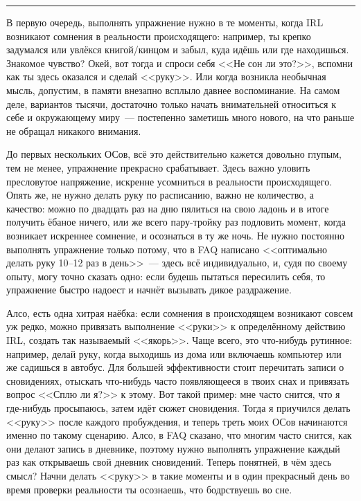 \documentclass[a4paper,14pt,oneside]{memoir}
\begin{document}
\smallskip

\fancybreak{* * *}

В первую очередь, выполнять упражнение нужно в те моменты, когда IRL возникают сомнения в реальности происходящего: например, ты крепко задумался или увлёкся книгой/кинцом и забыл, куда идёшь или где находишься. Знакомое чувство? Окей, вот тогда и спроси себя <<Не сон ли это?>>, вспомни как ты здесь оказался и сделай <<руку>>. Или когда возникла необычная мысль, допустим, в памяти внезапно всплыло давнее воспоминание. На самом деле, вариантов тысячи, достаточно только начать внимательней относиться к себе и окружающему миру~--- постепенно заметишь много нового, на что раньше не обращал никакого внимания. 

До  первых нескольких ОСов, всё это действительно кажется довольно глупым, тем не менее, упражнение прекрасно срабатывает. Здесь важно уловить пресловутое напряжение, искренне усомниться в реальности происходящего. Опять же, не нужно делать руку по расписанию, важно не количество, а качество: можно по двадцать раз на дню пялиться на свою ладонь и в итоге получить ёбаное ничего,  или же всего пару-тройку раз подловить момент, когда возникает искреннее сомнение, и осознаться в ту же ночь. Не нужно постоянно выполнять упражнение только потому, что в FAQ написано <<оптимально делать руку 10--12 раз в день>>~--- здесь всё индивидуально, и, судя по своему опыту, могу точно сказать одно: если будешь пытаться пересилить себя, то упражнение быстро надоест и начнёт вызывать дикое раздражение.

Алсо, есть одна хитрая наёбка: если сомнения в происходящем возникают совсем уж редко, можно привязать выполнение <<руки>> к определённому действию IRL, создать так называемый <<якорь>>. Чаще всего, это что-нибудь рутинное: например, делай руку, когда выходишь из дома или включаешь компьютер или же садишься в автобус. Для большей эффективности стоит перечитать записи о сновидениях, отыскать что-нибудь часто появляющееся в твоих снах и привязать вопрос <<Сплю ли я?>> к этому. Вот такой пример: мне часто снится, что я где-нибудь просыпаюсь, затем идёт сюжет сновидения. Тогда я приучился делать <<руку>> после каждого пробуждения, и теперь треть моих ОСов начинаются именно по такому сценарию. Алсо, в FAQ сказано, что многим часто снится, как они делают запись в дневнике, поэтому нужно выполнять упражнение каждый раз как открываешь свой дневник сновидений. Теперь понятней, в чём здесь смысл? Начни делать <<руку>> в такие моменты и в один прекрасный день во время проверки реальности ты осознаешь, что бодрствуешь во сне.
\end{document}
